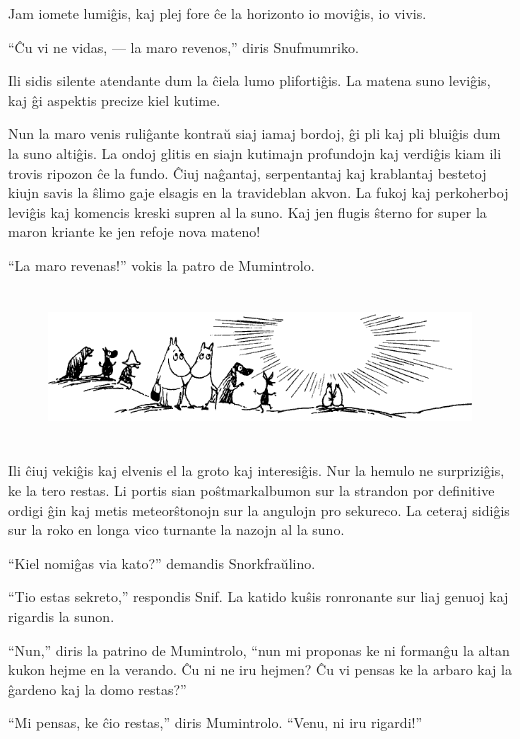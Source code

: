 Jam iomete lumiĝis, kaj plej fore ĉe la horizonto io moviĝis, io vivis.

``Ĉu vi ne vidas, --- la maro revenos,'' diris Snufmumriko.

Ili sidis silente atendante dum la ĉiela lumo plifortiĝis. La matena suno leviĝis, kaj ĝi aspektis precize kiel kutime.

Nun la maro venis ruliĝante kontraŭ siaj iamaj bordoj, ĝi pli kaj pli bluiĝis dum la suno altiĝis. La ondoj glitis en siajn kutimajn profundojn kaj verdiĝis kiam ili trovis ripozon ĉe la fundo. Ĉiuj naĝantaj, serpentantaj kaj krablantaj bestetoj kiujn savis la ŝlimo gaje elsagis en la travideblan akvon. La fukoj kaj perkoherboj leviĝis kaj komencis kreski supren al la suno. Kaj jen flugis ŝterno for super la maron kriante ke jen refoje nova mateno!

``La maro revenas!'' vokis la patro de Mumintrolo.

\begin{figure}[htbp]
\centering
\includegraphics[width=450pt,height=115pt]{10-2.png}
\caption{}
\label{10-2}
\end{figure}

Ili ĉiuj vekiĝis kaj elvenis el la groto kaj interesiĝis. Nur la hemulo ne surpriziĝis, ke la tero restas. Li portis sian poŝtmarkalbumon sur la strandon por definitive ordigi ĝin kaj metis meteorŝtonojn sur la angulojn pro sekureco. La ceteraj sidiĝis sur la roko en longa vico turnante la nazojn al la suno.

``Kiel nomiĝas via kato?'' demandis Snorkfraŭlino.

``Tio estas sekreto,'' respondis Snif. La katido kuŝis ronronante sur liaj genuoj kaj rigardis la sunon.

``Nun,'' diris la patrino de Mumintrolo, ``nun mi proponas ke ni formanĝu la altan kukon hejme en la verando. Ĉu ni ne iru hejmen? Ĉu vi pensas ke la arbaro kaj la ĝardeno kaj la domo restas?''

``Mi pensas, ke ĉio restas,'' diris Mumintrolo. ``Venu, ni iru rigardi!''




